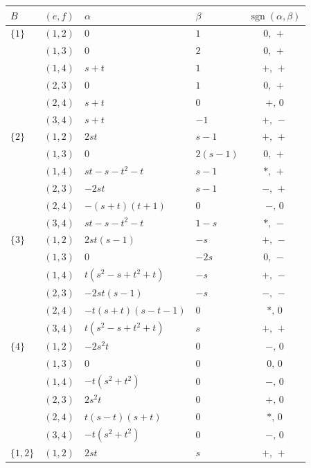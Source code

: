 \documentclass[11pt]{article}
\theoremstyle{remark}
\begin{document}
{\small
\begin{longtable}{@{}l c l l c@{}}
\toprule
$B$ & $(e,f)$ & $\alpha$ & $\beta$ & $\operatorname{sgn}(\alpha,\beta)$\\
\midrule
\endhead
$\{1\}$ & $(1,2)$ & $0$ & $1$ & $0,\,+$ \\
 & $(1,3)$ & $0$ & $2$ & $0,\,+$ \\
 & $(1,4)$ & $s + t$ & $1$ & $+,\,+$ \\
 & $(2,3)$ & $0$ & $1$ & $0,\,+$ \\
 & $(2,4)$ & $s + t$ & $0$ & $+,\,0$ \\
 & $(3,4)$ & $s + t$ & $-1$ & $+,\,-$ \\
\midrule
$\{2\}$ & $(1,2)$ & $2 s t$ & $s - 1$ & $+,\,+$ \\
 & $(1,3)$ & $0$ & $2 \left(s - 1\right)$ & $0,\,+$ \\
 & $(1,4)$ & $s t - s - t^{2} - t$ & $s - 1$ & $\ast,\,+$ \\
 & $(2,3)$ & $- 2 s t$ & $s - 1$ & $-,\,+$ \\
 & $(2,4)$ & $- \left(s + t\right) \left(t + 1\right)$ & $0$ & $-,\,0$ \\
 & $(3,4)$ & $s t - s - t^{2} - t$ & $1 - s$ & $\ast,\,-$ \\
\midrule
$\{3\}$ & $(1,2)$ & $2 s t \left(s - 1\right)$ & $- s$ & $+,\,-$ \\
 & $(1,3)$ & $0$ & $- 2 s$ & $0,\,-$ \\
 & $(1,4)$ & $t \left(s^{2} - s + t^{2} + t\right)$ & $- s$ & $+,\,-$ \\
 & $(2,3)$ & $- 2 s t \left(s - 1\right)$ & $- s$ & $-,\,-$ \\
 & $(2,4)$ & $- t \left(s + t\right) \left(s - t - 1\right)$ & $0$ & $\ast,\,0$ \\
 & $(3,4)$ & $t \left(s^{2} - s + t^{2} + t\right)$ & $s$ & $+,\,+$ \\
\midrule
$\{4\}$ & $(1,2)$ & $- 2 s^{2} t$ & $0$ & $-,\,0$ \\
 & $(1,3)$ & $0$ & $0$ & $0,\,0$ \\
 & $(1,4)$ & $- t \left(s^{2} + t^{2}\right)$ & $0$ & $-,\,0$ \\
 & $(2,3)$ & $2 s^{2} t$ & $0$ & $+,\,0$ \\
 & $(2,4)$ & $t \left(s - t\right) \left(s + t\right)$ & $0$ & $\ast,\,0$ \\
 & $(3,4)$ & $- t \left(s^{2} + t^{2}\right)$ & $0$ & $-,\,0$ \\
\midrule
$\{1,2\}$ & $(1,2)$ & $2 s t$ & $s$ & $+,\,+$ \\

\end{longtable}}
\end{document}
